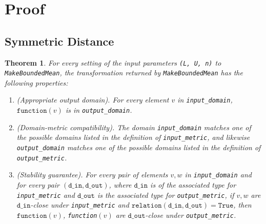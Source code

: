 \documentclass[11pt,a4paper]{article}
\newtheorem{theorem}{Theorem}
\theoremstyle{definition}
\newcommand{\din}{\texttt{d\_in}}
\newcommand{\dout}{\texttt{d\_out}}
\newcommand{\Relation}{\texttt{relation}}
\newcommand{\True}{\texttt{True}}
\newcommand{\function}{\texttt{function}}
\begin{document}
\section{Proof}
\subsection{Symmetric Distance}
\begin{theorem}
    For every setting of the input parameters \texttt{(L, U, n)} to \texttt{MakeBoundedMean}, the transformation returned by \texttt{MakeBoundedMean} has the following properties:
    \begin{enumerate}
        \item \textup{(Appropriate output domain).} For every element $v$ in \texttt{input\_domain}, $\function(v)$ is in \texttt{output\_domain}. %
        \item \textup{(Domain-metric compatibility).} The domain \texttt{input\_domain} matches one of the possible domains listed in the definition of \texttt{input\_metric}, and likewise \texttt{output\_domain} matches one of the possible domains listed in the definition of \texttt{output\_metric}.
        
        \item \textup{(Stability guarantee).} For every pair of elements $v, w$ in \texttt{input\_domain} and for every pair $(\din, \dout)$, where $\din$ is of the associated type for \texttt{input\_metric} and $\dout$ is the associated type for \texttt{output\_metric}, if $v,w$ are $\din$-close under \texttt{input\_metric} and $\Relation(\din, \dout) = \True$, then $\function(v)$, \texttt{function}$(v)$ are $\dout$-close under \texttt{output\_metric}.
    \end{enumerate}
\end{theorem}
\end{document}
